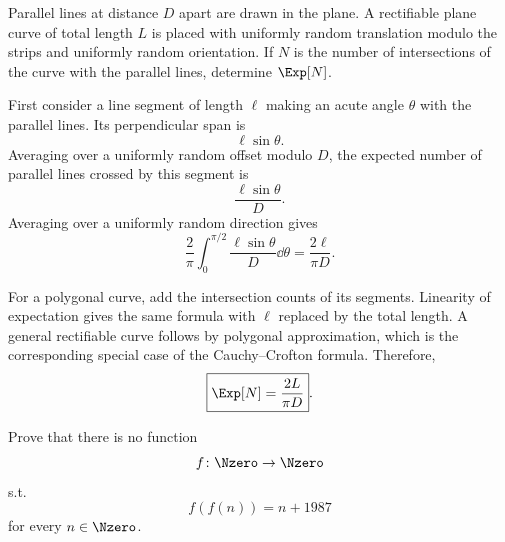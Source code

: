     \begin{expectedproblem}
        Parallel lines at distance $D$ apart are drawn in the plane. A
        rectifiable plane curve of total length $L$ is placed with uniformly
        random translation modulo the strips and uniformly random orientation.
        If $N$ is the number of intersections of the curve with the parallel
        lines, determine $\Exp[N]$.
    \end{expectedproblem}

    \begin{solution}
        First consider a line segment of length $\ell$ making an acute angle
        $\theta$ with the parallel lines. Its perpendicular span is
        \[
            \ell\sin\theta.
        \]
        Averaging over a uniformly random offset modulo $D$, the expected number
        of parallel lines crossed by this segment is
        \[
            \frac{\ell\sin\theta}{D}.
        \]
        Averaging over a uniformly random direction gives
        \[
            \frac{2}{\pi}
            \int_0^{\pi/2}
            \frac{\ell\sin\theta}{D}\dd\theta
            =
            \frac{2\ell}{\pi D}.
        \]

        For a polygonal curve, add the intersection counts of its segments.
        Linearity of expectation gives the same formula with $\ell$ replaced by
        the total length. A general rectifiable curve follows by polygonal
        approximation, which is the corresponding special case of the
        Cauchy--Crofton formula. Therefore,
        \[
            \boxed{\Exp[N]=\frac{2L}{\pi D}}.
        \]
    \end{solution}

    \begin{expectedproblem}[1987 IMO]
        Prove that there is no function
        \[
            f\colon\Nzero\to\Nzero
        \]
        s.t.
        \[
            f(f(n))=n+1987
        \]
        for every $n\in\Nzero$.
    \end{expectedproblem}

